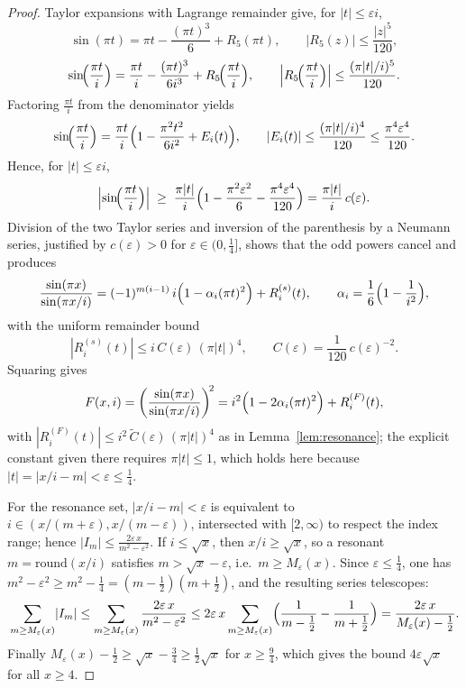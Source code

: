 \begin{lemma}
\begin{proof}
Taylor expansions with Lagrange remainder give, for $|t|\le\varepsilon i$,
\[
\sin(\pi t)=\pi t-\frac{(\pi t)^3}{6}+R_5(\pi t),\qquad |R_5(z)|\le \frac{|z|^5}{120},
\]
\[
\sin\!\Bigl(\frac{\pi t}{i}\Bigr)=\frac{\pi t}{i}-\frac{(\pi t)^3}{6i^3}+R_5\!\Bigl(\frac{\pi t}{i}\Bigr),
\qquad 
\Bigl|R_5\!\Bigl(\frac{\pi t}{i}\Bigr)\Bigr|\le \frac{(\pi |t|/i)^5}{120}.
\]
Factoring $\frac{\pi t}{i}$ from the denominator yields
\[
\sin\!\Bigl(\frac{\pi t}{i}\Bigr)
=\frac{\pi t}{i}\Bigl(1-\frac{\pi^2 t^2}{6i^2}+E_i(t)\Bigr),
\qquad 
|E_i(t)|\le \frac{(\pi |t|/i)^4}{120}\le \frac{\pi^4\varepsilon^4}{120}.
\]
Hence, for $|t|\le \varepsilon i$,
\[
\Bigl|\sin\!\Bigl(\frac{\pi t}{i}\Bigr)\Bigr|
\;\ge\;\frac{\pi |t|}{i}\Bigl(1-\frac{\pi^2\varepsilon^2}{6}-\frac{\pi^4\varepsilon^4}{120}\Bigr)
=\frac{\pi |t|}{i}\,c(\varepsilon).
\]
Division of the two Taylor series and inversion of the parenthesis by a Neumann series, justified by $c(\varepsilon)>0$ for $\varepsilon\in(0,\tfrac14]$, shows that the odd powers cancel and produces
\[
\frac{\sin(\pi x)}{\sin(\pi x/i)}
=(-1)^{m(i-1)}\,i\Bigl(1-\alpha_i(\pi t)^2\Bigr)+R_i^{(s)}(t),
\qquad \alpha_i=\frac{1}{6}\Bigl(1-\frac{1}{i^2}\Bigr),
\]
with the uniform remainder bound
\[
|R_i^{(s)}(t)|\le i\,C(\varepsilon)\,(\pi |t|)^4,
\qquad 
C(\varepsilon)=\frac{1}{120}\,c(\varepsilon)^{-2}.
\]
Squaring gives
\[
F(x,i)=\left(\frac{\sin(\pi x)}{\sin(\pi x/i)}\right)^{\!2}
= i^2\Bigl(1-2\alpha_i(\pi t)^2\Bigr)+R_i^{(F)}(t),
\]
with $|R_i^{(F)}(t)|\le i^2\,\widetilde C(\varepsilon)\,(\pi |t|)^4$ as in Lemma~\ref{lem:resonance}; the explicit constant given there requires $\pi|t|\le1$, which holds here because $|t|=|x/i-m|<\varepsilon\le\tfrac14$. 

For the resonance set, $|x/i-m|<\varepsilon$ is equivalent to $i\in(x/(m+\varepsilon),x/(m-\varepsilon))$, intersected with $[2,\infty)$ to respect the index range; hence $|I_m|\le\frac{2\varepsilon\,x}{m^2-\varepsilon^2}$. If $i\le\sqrt{x}$, then $x/i\ge\sqrt{x}$, so a resonant $m=\mathrm{round}(x/i)$ satisfies $m>\sqrt{x}-\varepsilon$, i.e.\ $m\ge M_\varepsilon(x)$. Since $\varepsilon\le\tfrac14$, one has $m^2-\varepsilon^2\ge m^2-\tfrac14=(m-\tfrac12)(m+\tfrac12)$, and the resulting series telescopes:
\[
\sum_{m\ge M_\varepsilon(x)}\! |I_m|
\le\sum_{m\ge M_\varepsilon(x)}\frac{2\varepsilon\,x}{m^2-\varepsilon^2}
\le 2\varepsilon\,x\sum_{m\ge M_\varepsilon(x)}\Bigl(\frac{1}{m-\frac12}-\frac{1}{m+\frac12}\Bigr)
=\frac{2\varepsilon\,x}{M_\varepsilon(x)-\frac12}.
\]
Finally $M_\varepsilon(x)-\tfrac12\ge\sqrt{x}-\tfrac34\ge\tfrac12\sqrt{x}$ for $x\ge\tfrac94$, which gives the bound $4\varepsilon\sqrt{x}$ for all $x\ge 4$.
\end{proof}
\end{lemma}


